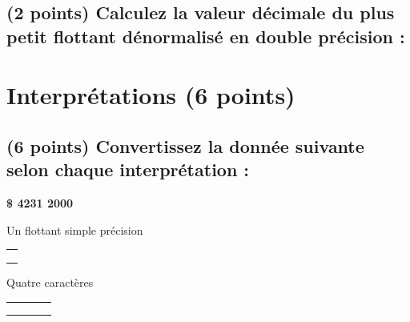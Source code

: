 \documentclass[11pt,a4paper]{article}
\begin{document}
\vspace*{-0.5cm}

\subsection{(2 points) Calculez la valeur décimale du plus petit flottant dénormalisé en double précision : }

\bigskip


\clearpage


\section{Interprétations (6 points)}

\subsection{(6 points) Convertissez la donnée suivante selon chaque interprétation : }

\bigskip

\begin{center}
\textbf{\Large \$ 4231 2000 }
\end{center}

\smallskip

\begin{table}[!ht]
  \centering
  \begin{minipage}{0.50\textwidth}
    \centering

Un flottant simple précision

\medskip

\begin{tabular}{| C{5cm} |}
\hline
\phantom{42} \\
\phantom{42} \\
\phantom{42} \\
\hline
\end{tabular}

  \end{minipage}
  \hfillx
  \begin{minipage}{0.50\textwidth}
    \centering

Quatre caractères

\medskip

\begin{tabular}{| m{1cm} | m{1cm} | m{1cm} | m{1cm} |}
\hline
\phantom{I} & \phantom{I} & \phantom{I} & \phantom{I} \\
\phantom{I} & \phantom{I} & \phantom{I} & \phantom{I} \\
\phantom{I} & \phantom{I} & \phantom{I} & \phantom{I} \\
\hline
\end{tabular}

  \end{minipage}
\end{table}
\end{document}
